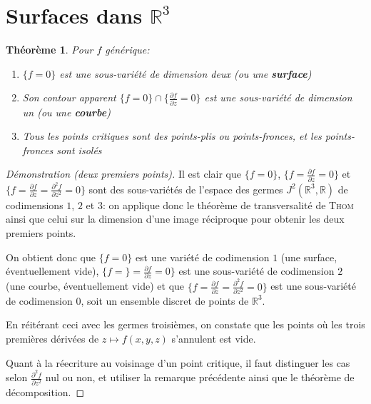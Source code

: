 \documentclass[a4paper]{article}
\newcommand{\R}{\mathbb{R}}
\newtheorem{thm}{Théorème}
\theoremstyle{definition}
\begin{document}
\section{Surfaces dans $\R^3$}
\setcounter{thm}{6}
\begin{thm}
	Pour $f$ générique:
	\begin{enumerate}
		\item $\{f=0\}$ est une sous-variété de dimension deux (ou une \textbf{surface})
		\item Son contour apparent $\{f=0\}\cap \{\frac{\partial f}{\partial z}=0\}$ est une sous-variété de dimension un (ou une \textbf{courbe})
		\item Tous les points critiques sont des points-plis ou points-fronces, et les points-fronces sont isolés
	\end{enumerate}
\end{thm}
\begin{proof}[Démonstration (deux premiers points)]
	Il est clair que $\{f=0\}$, $\{f=\frac{\partial f}{\partial z}=0\}$ et $\{f=\frac{\partial f}{\partial z}=\frac{\partial^2 f}{\partial z^2}=0\}$ sont des sous-variétés de l'espace des germes $J^2(\R^3,\R)$ de codimensions $1$, $2$ et $3$: on applique donc le théorème de transversalité de \textsc{Thom} ainsi que celui sur la dimension d'une image réciproque pour obtenir les deux premiers points.

	On obtient donc que $\{f=0\}$ est une variété de codimension $1$ (une surface, éventuellement vide), $\{f=\}=\frac{\partial f}{\partial z}=0\}$ est une sous-variété de codimension $2$ (une courbe, éventuellement vide) et que $\{f=\frac{\partial f}{\partial z}=\frac{\partial^2 f}{\partial z^2}=0\}$ est une sous-variété de codimension $0$, soit un ensemble discret de points de $\R^3$.

	En réitérant ceci avec les germes troisièmes, on constate que les points où les trois premières dérivées de $z \mapsto f(x,y,z)$ s'annulent est vide.

	Quant à la réecriture au voisinage d'un point critique, il faut distinguer les cas selon $\frac{\partial^2 f}{\partial z^2}$ nul ou non, et utiliser la remarque précédente ainsi que le théorème de décomposition.
\end{proof}
\end{document}
